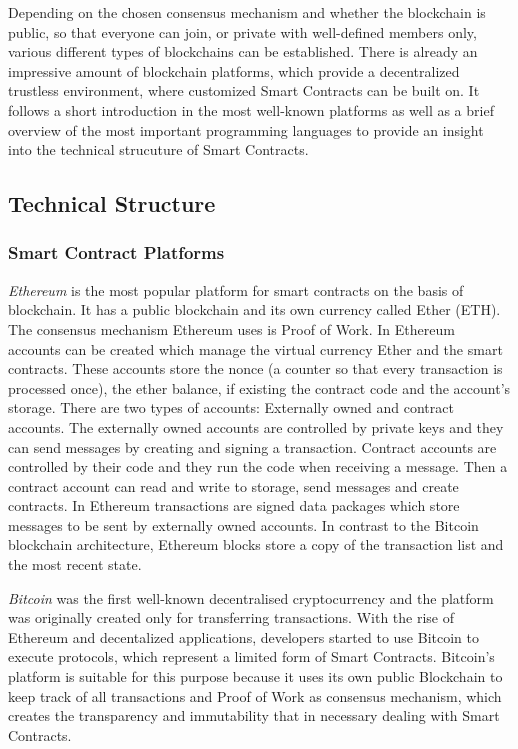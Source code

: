 \documentclass[conference]{IEEEtran}
\begin{document}
Depending on the chosen consensus mechanism and whether the blockchain is public, so that everyone can join, or private with well-defined members only, various different types of blockchains can be established. There is already an impressive amount of blockchain platforms, which provide a decentralized trustless environment, where customized Smart Contracts can be built on. It follows a short introduction in the most well-known platforms as well as a brief overview of the most important programming languages to provide an insight into the technical strucuture of Smart Contracts. 
\subsection{Technical Structure}

\subsubsection{Smart Contract Platforms}
\textit{Ethereum} is the most popular platform for smart contracts on the basis of blockchain. \cite{Meitinger2017} It has a public blockchain and its own currency called Ether (ETH). The consensus mechanism Ethereum uses is Proof of Work. In Ethereum accounts can be created which manage the virtual currency Ether and the smart contracts. \cite{Bartoletti2017} These accounts store the nonce (a counter so that every transaction is processed once), the ether balance, if existing the contract code and the account's storage. There are two types of accounts: Externally owned and contract accounts. The externally owned accounts are controlled by private keys and they can send messages by creating and signing a transaction. Contract accounts are controlled by their code and they run the code when receiving a message. Then a contract account can read and write to storage, send messages and create contracts. In Ethereum transactions are signed data packages which store messages to be sent by externally owned accounts. In contrast to the Bitcoin blockchain architecture, Ethereum blocks store a copy of the transaction list and the most recent state. \cite{Buterin2014}  \par
\textit{Bitcoin} was the first well-known decentralised cryptocurrency and the platform was originally created only for transferring transactions. With the rise of Ethereum and decentalized applications, developers started to use Bitcoin to execute protocols, which represent a limited form of Smart Contracts. Bitcoin's platform is suitable for this purpose because it uses its own public Blockchain to keep track of all transactions and Proof of Work as consensus mechanism, which creates the transparency and immutability that in necessary dealing with Smart Contracts. \cite{Bartoletti2017} \par 
\end{document}
